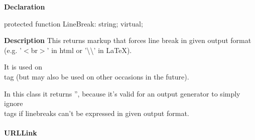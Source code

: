 \documentclass{report}
\newif\ifpdf
\begin{document}
\label{PasDoc_Gen.TDocGenerator-LineBreak}
\begin{list}{}{
\setlength{\itemindent}{0cm}
\setlength{\listparindent}{0cm}
\setlength{\leftmargin}{\evensidemargin}
\addtolength{\leftmargin}{\tmplength}
\settowidth{\labelsep}{X}
\addtolength{\leftmargin}{\labelsep}
\setlength{\labelwidth}{\tmplength}
}
\item[\textbf{Declaration}\hfill]
\ifpdf
\begin{flushleft}
\fi
\begin{ttfamily}
protected function LineBreak: string; virtual;\end{ttfamily}

\ifpdf
\end{flushleft}
\fi

\par
\item[\textbf{Description}]
This returns markup that forces line break in given output format (e.g. '{$<$}br{$>$}' in html or '{\textbackslash}{\textbackslash}' in LaTeX).\hfill\vspace*{1ex}



It is used on \\{} tag (but may also be used on other occasions in the future).

In this class it returns '', because it's valid for an output generator to simply ignore \\{} tags if linebreaks can't be expressed in given output format.

\end{list}
\paragraph*{URLLink}\hspace*{\fill}
\end{document}
